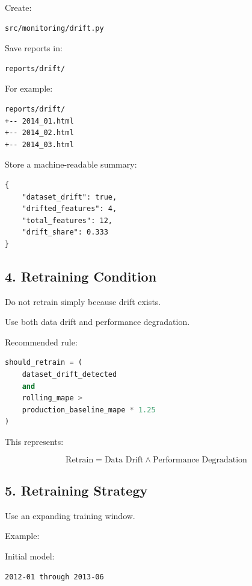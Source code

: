 \documentclass[11pt,a4paper]{article}
\begin{document}
Create:

\begin{lstlisting}
src/monitoring/drift.py
\end{lstlisting}

Save reports in:

\begin{lstlisting}
reports/drift/
\end{lstlisting}

For example:

\begin{lstlisting}
reports/drift/
+-- 2014_01.html
+-- 2014_02.html
+-- 2014_03.html
\end{lstlisting}

Store a machine-readable summary:

\begin{lstlisting}
{
    "dataset_drift": true,
    "drifted_features": 4,
    "total_features": 12,
    "drift_share": 0.333
}
\end{lstlisting}

\subsection{4. Retraining Condition}

Do not retrain simply because drift exists.

Use both data drift and performance degradation.

Recommended rule:

\begin{lstlisting}[language=Python]
should_retrain = (
    dataset_drift_detected
    and
    rolling_mape >
    production_baseline_mape * 1.25
)
\end{lstlisting}

This represents:

\[
\text{Retrain}
=
\text{Data Drift}
\land
\text{Performance Degradation}
\]

\subsection{5. Retraining Strategy}

Use an expanding training window.

Example:

Initial model:

\begin{lstlisting}
2012-01 through 2013-06
\end{lstlisting}
\end{document}
